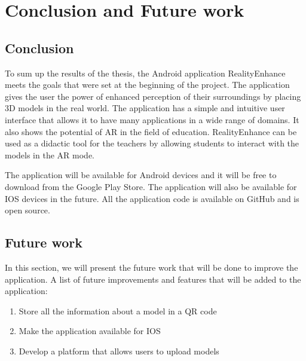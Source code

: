 \chapter{Conclusion and Future work}\label{cap:conclusion}

\section{Conclusion}
To sum up the results of the thesis, the Android application RealityEnhance meets the goals that were set at the beginning of the project. The application gives the user the power of enhanced perception of their surroundings by placing \ac{3D} models in the real world. The application has a simple and intuitive user interface that allows it to have many applications in a wide range of domains. It also shows the potential of \ac{AR} in the field of education. RealityEnhance can be used as a didactic tool for the teachers by allowing students to interact with the models in the \ac{AR} mode.

The application will be available for Android devices and it will be free to download from the Google Play Store. The application will also be available for IOS devices in the future. All the application code is available on GitHub\cite{RealityEnhance} and is open source.



\section{Future work}
In this section, we will present the future work that will be done to improve the application.
A list of future improvements and features that will be added to the application:
\begin{enumerate}
    \item{Store all the information about a model in a QR code}
    \item{Make the application available for IOS}
    \item{Develop a platform that allows users to upload models}
\end{enumerate}
